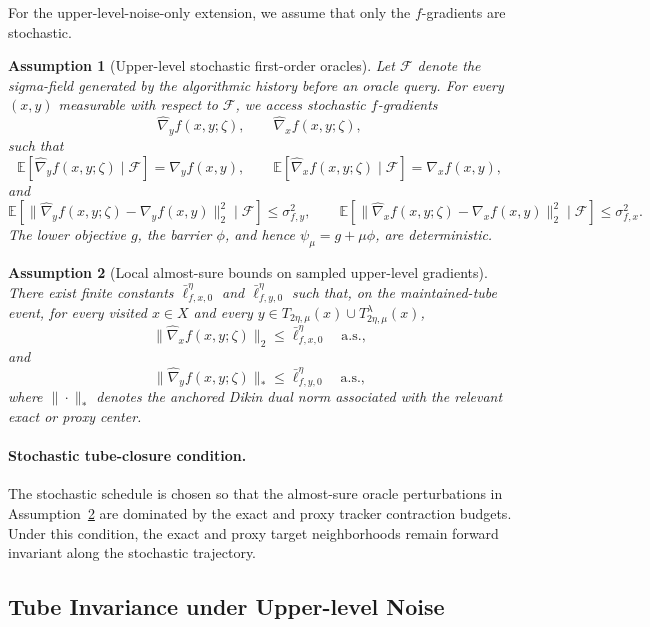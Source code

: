 \documentclass{article}
\newtheorem{assumption}{Assumption}
\begin{document}
For the upper-level-noise-only extension, we assume that only the \(f\)-gradients are stochastic.

\begin{assumption}[Upper-level stochastic first-order oracles]
\label{ass:stoch_oracle}
Let \(\mathcal F\) denote the sigma-field generated by the algorithmic history before an oracle query.
For every \((x,y)\) measurable with respect to \(\mathcal F\), we access stochastic \(f\)-gradients
\[
\widehat\nabla_y f(x,y;\zeta),
\qquad
\widehat\nabla_x f(x,y;\zeta),
\]
such that
\[
\mathbb E[\widehat\nabla_y f(x,y;\zeta)\mid\mathcal F]=\nabla_y f(x,y),
\qquad
\mathbb E[\widehat\nabla_x f(x,y;\zeta)\mid\mathcal F]=\nabla_x f(x,y),
\]
and
\[
\mathbb E[\|\widehat\nabla_y f(x,y;\zeta)-\nabla_y f(x,y)\|_2^2\mid\mathcal F]\le \sigma_{f,y}^2,
\qquad
\mathbb E[\|\widehat\nabla_x f(x,y;\zeta)-\nabla_x f(x,y)\|_2^2\mid\mathcal F]\le \sigma_{f,x}^2.
\]
The lower objective \(g\), the barrier \(\phi\), and hence \(\psi_\mu=g+\mu\phi\), are deterministic.
\end{assumption}

\begin{assumption}[Local almost-sure bounds on sampled upper-level gradients]
\label{ass:stoch_local_bounds}
There exist finite constants \(\bar\ell_{f,x,0}^{\eta}\) and
\(\bar\ell_{f,y,0}^{\eta}\) such that, on the maintained-tube event, for every visited
\(x\in X\) and every
\(y\in T_{2\eta,\mu}(x)\cup T_{2\eta,\mu}^{\lambda}(x)\),
\[
\|\widehat\nabla_x f(x,y;\zeta)\|_2\le \bar\ell_{f,x,0}^{\eta}
\quad\text{a.s.},
\]
and
\[
\|\widehat\nabla_y f(x,y;\zeta)\|_{*}\le \bar\ell_{f,y,0}^{\eta}
\quad\text{a.s.},
\]
where \(\|\cdot\|_*\) denotes the anchored Dikin dual norm associated with the relevant exact or
proxy center.
\end{assumption}

\paragraph{Stochastic tube-closure condition.}
The stochastic schedule is chosen so that the almost-sure oracle perturbations in
Assumption~\ref{ass:stoch_local_bounds} are dominated by the exact and proxy tracker contraction
budgets. Under this condition, the exact and proxy target neighborhoods remain forward invariant along the
stochastic trajectory.


\subsection{Tube Invariance under Upper-level Noise}
\label{app:stoch_tube_maintenance}
\end{document}
